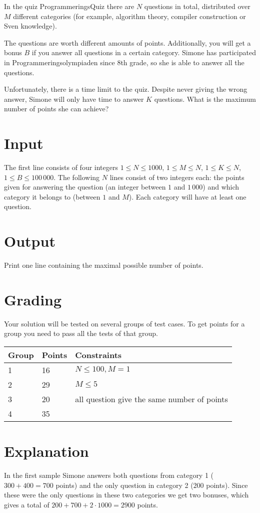 In the quiz ProgrammeringsQuiz there are $N$ questions in total, distributed over $M$ different categories (for example, algorithm theory, compiler construction or Sven knowledge).

The questions are worth different amounts of points. Additionally, you will get a bonus $B$ if you answer all questions in a certain category.
Simone has participated in Programmeringsolympiaden since 8th grade, so she is able to answer all the questions.

Unfortunately, there is a time limit to the quiz. Despite never giving the wrong answer, Simone will only have time to answer $K$ questions. What is the maximum number of points she can achieve?
\section*{Input}
The first line consists of four integers $1 \le N \le 1000$, $1 \le M \le N$, $1 \le K \le N$, $1 \le B \le 100\,000$.
The following $N$ lines consist of two integers each: the points given for answering the question (an integer between $1$ and $1\,000$) and which category it belongs to (between $1$ and $M$).
Each category will have at least one question.
\section*{Output}
Print one line containing the maximal possible number of points.
\section*{Grading}
Your solution will be tested on several groups of test cases. To get points for a group you need to pass all the tests of that group.

\begin{tabular}{| l | l | l |}
  \hline
  Group & Points & Constraints\\ \hline
  1     & 16         & $N \le 100, M = 1$ \\ \hline
  2     & 29         & $M \le 5$ \\ \hline
  3     & 20         & all question give the same number of points \\ \hline
  4     & 35         & \\ \hline
\end{tabular}
\section*{Explanation}
In the first sample Simone answers both questions from category 1 ($300 + 400 = 700$ points) and the only question in category 2 ($200$ points). Since these were the only questions in these two categories we get two bonuses, which gives a total of $200 + 700 + 2 \cdot 1000 = 2900$ points.
